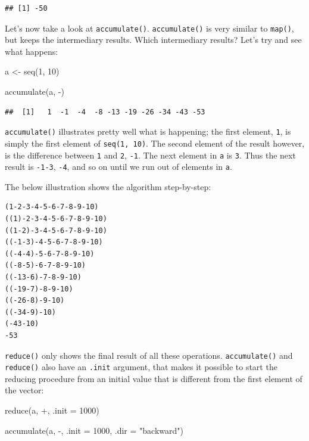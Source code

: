 \documentclass[
]{article}
\newenvironment{Shaded}{\begin{snugshade}}{\end{snugshade}}
\newcommand{\AttributeTok}[1]{\textcolor[rgb]{0.77,0.63,0.00}{#1}}
\newcommand{\DecValTok}[1]{\textcolor[rgb]{0.00,0.00,0.81}{#1}}
\newcommand{\FunctionTok}[1]{\textcolor[rgb]{0.00,0.00,0.00}{#1}}
\newcommand{\NormalTok}[1]{#1}
\newcommand{\OtherTok}[1]{\textcolor[rgb]{0.56,0.35,0.01}{#1}}
\newcommand{\StringTok}[1]{\textcolor[rgb]{0.31,0.60,0.02}{#1}}
\begin{document}
\begin{verbatim}
## [1] -50
\end{verbatim}

Let's now take a look at \texttt{accumulate()}. \texttt{accumulate()} is very similar to \texttt{map()}, but keeps the
intermediary results. Which intermediary results? Let's try and see what happens:

\begin{Shaded}
\begin{Highlighting}[]
\NormalTok{a }\OtherTok{\textless{}{-}} \FunctionTok{seq}\NormalTok{(}\DecValTok{1}\NormalTok{, }\DecValTok{10}\NormalTok{)}

\FunctionTok{accumulate}\NormalTok{(a, }\StringTok{\textasciigrave{}}\AttributeTok{{-}}\StringTok{\textasciigrave{}}\NormalTok{)}
\end{Highlighting}
\end{Shaded}

\begin{verbatim}
##  [1]   1  -1  -4  -8 -13 -19 -26 -34 -43 -53
\end{verbatim}

\texttt{accumulate()} illustrates pretty well what is happening; the first element, \texttt{1}, is simply the
first element of \texttt{seq(1,\ 10)}. The second element of the result however, is the difference between
\texttt{1} and \texttt{2}, \texttt{-1}. The next element in \texttt{a} is \texttt{3}. Thus the next result is \texttt{-1-3}, \texttt{-4}, and so
on until we run out of elements in \texttt{a}.

The below illustration shows the algorithm step-by-step:

\begin{verbatim}
(1-2-3-4-5-6-7-8-9-10)
((1)-2-3-4-5-6-7-8-9-10)
((1-2)-3-4-5-6-7-8-9-10)
((-1-3)-4-5-6-7-8-9-10)
((-4-4)-5-6-7-8-9-10)
((-8-5)-6-7-8-9-10)
((-13-6)-7-8-9-10)
((-19-7)-8-9-10)
((-26-8)-9-10)
((-34-9)-10)
(-43-10)
-53
\end{verbatim}

\texttt{reduce()} only shows the final result of all these operations. \texttt{accumulate()} and \texttt{reduce()} also
have an \texttt{.init} argument, that makes it possible to start the reducing procedure from an initial
value that is different from the first element of the vector:

\begin{Shaded}
\begin{Highlighting}[]
\FunctionTok{reduce}\NormalTok{(a, }\StringTok{\textasciigrave{}}\AttributeTok{+}\StringTok{\textasciigrave{}}\NormalTok{, }\AttributeTok{.init =} \DecValTok{1000}\NormalTok{)}

\FunctionTok{accumulate}\NormalTok{(a, }\StringTok{\textasciigrave{}}\AttributeTok{{-}}\StringTok{\textasciigrave{}}\NormalTok{, }\AttributeTok{.init =} \DecValTok{1000}\NormalTok{, }\AttributeTok{.dir =} \StringTok{"backward"}\NormalTok{)}
\end{Highlighting}
\end{Shaded}
\end{document}
